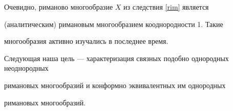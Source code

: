 \begin{notes}


Очевидно, риманово многообразие $X$ из следствия \ref{rim} является


(аналитическим) римановым многообразием кооднородности 1. Такие


многообразия активно изучались в последнее время.


\end{notes}





Следующая наша цель --- характеризация связных подобно однородных неоднородных


римановых многообразий и конформно эквивалентных им однородных


римановых многообразий.





